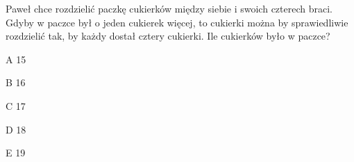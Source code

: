 \begin{tresc}
Paweł chce rozdzielić paczkę cukierków między siebie i swoich czterech braci. Gdyby w paczce był o jeden cukierek więcej, to cukierki można by sprawiedliwie rozdzielić tak, by każdy dostał cztery cukierki. Ile cukierków było w paczce?
\end{tresc}
\begin{wariant}{A} 15 \end{wariant}
\begin{wariant}{B} 16 \end{wariant}
\begin{wariant}{C} 17 \end{wariant}
\begin{wariant}{D} 18 \end{wariant}
\begin{wariant}{E} 19 \end{wariant}
